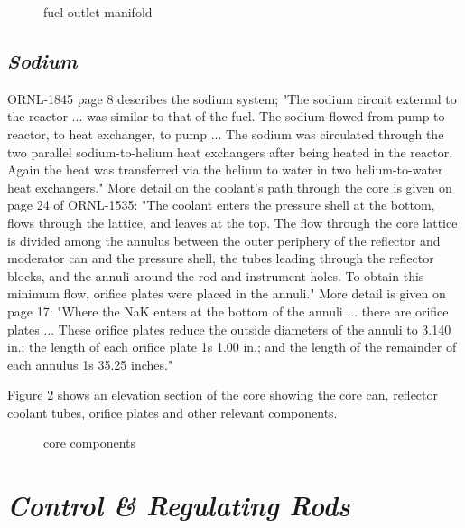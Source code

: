 \documentclass[ms,a4paper]{memoir}
\newcommand*{\msrarchive}{../../msr-archive}%
\begin{document}
\begin{figure}[H]
  \centering
  \caption{fuel outlet manifold \parencite[Figure 21]{ornl-1535}}
  \label{fig11}
\end{figure}

\subsection{\emph{Sodium}}

ORNL-1845 page 8 describes the sodium system; "The sodium circuit external to the reactor ... was similar to that of the fuel. The sodium flowed from pump to reactor, to heat exchanger, to pump ... The sodium was circulated through the two parallel sodium-to-helium heat exchangers after being heated in the reactor. Again the heat was transferred via the helium to water in two helium-to-water heat exchangers." More detail on the coolant's path through the core is given on page 24 of ORNL-1535: "The coolant enters the pressure shell at the bottom, flows through the lattice, and leaves at the top. The flow through the core lattice is divided among the annulus between the outer periphery of the reflector and moderator can and the pressure shell, the tubes leading through the reflector blocks, and the annuli around the rod and instrument holes. To obtain this minimum flow, orifice plates were placed in the annuli." More detail is given on page 17: "Where the NaK enters at the bottom of the annuli ... there are orifice plates ... These orifice plates reduce the outside diameters of the annuli to 3.140 in.; the length of each orifice plate 1s 1.00 in.; and the length of the remainder of each annulus 1s 35.25 inches."

Figure \ref{fig5} shows an elevation section of the core showing the core can, reflector coolant tubes, orifice plates and other relevant components.

\begin{figure}[H]
  \centering
  \caption{core components \parencite[Figure 11]{ornl-1535}}
  \label{fig5}
\end{figure}

\section{\emph{Control \& Regulating Rods}}
\end{document}
